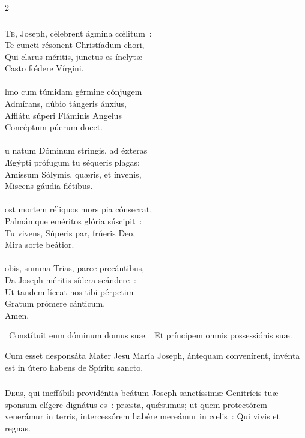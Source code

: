\documentclass[9pt,twoside]{extarticle}
\begin{document}
\begin{multicols}{2}
{\subsubsection*{\center {}}
\lettrine{T}e, Joseph, célebrent ágmina cœ́litum~:\\
Te cuncti résonent Christíadum chori,\\
Qui clarus méritis, junctus es ínclytæ\\
Casto fœ́dere Vírgini.\\
\\
lmo cum túmidam gérmine cónjugem\\
Admírans, dúbio tángeris ánxius,\\
Afflátu súperi Fláminis Angelus\\
Concéptum púerum docet.\\
\\
u natum Dóminum stringis, ad éxteras\\
Ægýpti prófugum tu séqueris plagas;\\
Amíssum Sólymis, quæris, et ínvenis,\\
Miscens gáudia flétibus.\\
\\
ost mortem réliquos mors pia cónsecrat,\\
Palmámque eméritos glória súscipit~:\\
Tu vivens, Súperis par, frúeris Deo,\\
Mira sorte beátior.\\
\\
obis, summa Trias, parce precántibus,\\
Da Joseph méritis sídera scándere~:\\
Ut tandem líceat nos tibi pérpetim\\
Gratum prómere cánticum.\\
Amen.

\begin{tightlist}{}
\item {}~Constítuit eum dóminum domus suæ. ~Et príncipem omnis possessiónis suæ.
\item {} Cum esset desponsáta Mater Jesu María Joseph, ántequam convenírent, invénta est in útero habens de Spíritu sancto.
\end{tightlist}

\subsubsection*{\center {}}
\lettrine{D}eus, qui ineffábili providéntia beátum Joseph sanctíssimæ Genitrícis tuæ sponsum elígere dignátus es~: præsta, quǽsumus; ut quem protectórem venerámur in terris, intercessórem habére mereámur in cœlis~: Qui vivis et regnas.

}
\end{multicols}
\end{document}
